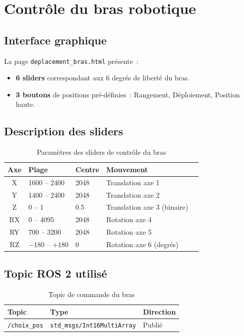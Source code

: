 \documentclass[12pt,a4paper]{report}
\begin{document}
\section{Contrôle du bras robotique}

\subsection{Interface graphique}

La page \texttt{deplacement\_bras.html} présente~:
\begin{itemize}
  \item \textbf{6 sliders} correspondant aux 6 degrés de liberté du bras.
  \item \textbf{3 boutons} de positions pré-définies~: Rangement, Déploiement, Position haute.
\end{itemize}

\subsection{Description des sliders}

\begin{table}[H]
\centering
\begin{tabularx}{\textwidth}{clllX}
\toprule
\textbf{Axe} & \textbf{Plage} & \textbf{Centre} & \textbf{Mouvement} \\
\midrule
X  & 1600 -- 2400 & 2048 & Translation axe 1 \\
Y  & 1400 -- 2400 & 2048 & Translation axe 2 \\
Z  & 0 -- 1       & 0.5  & Translation axe 3 (binaire) \\
RX & 0 -- 4095    & 2048 & Rotation axe 4 \\
RY & 700 -- 3200  & 2048 & Rotation axe 5 \\
RZ & $-180$ -- $+180$ & 0 & Rotation axe 6 (degrés) \\
\bottomrule
\end{tabularx}
\caption{Paramètres des sliders de contrôle du bras}
\end{table}

\subsection{Topic ROS 2 utilisé}

\begin{table}[H]
\centering
\begin{tabularx}{\textwidth}{lll}
\toprule
\textbf{Topic} & \textbf{Type} & \textbf{Direction} \\
\midrule
\texttt{/choix\_pos} & \texttt{std\_msgs/Int16MultiArray} & Publié \\
\bottomrule
\end{tabularx}
\caption{Topic de commande du bras}
\end{table}
\end{document}
